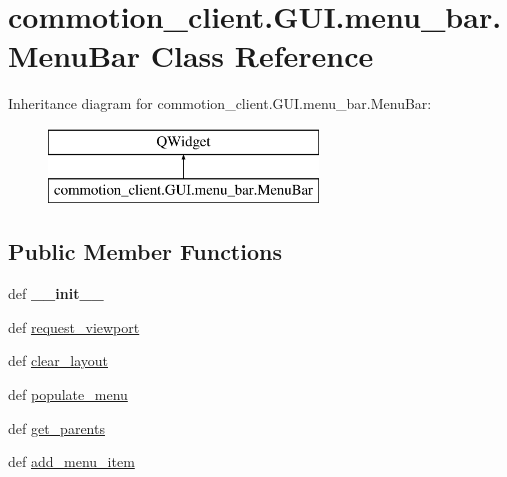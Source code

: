 \hypertarget{classcommotion__client_1_1GUI_1_1menu__bar_1_1MenuBar}{\section{commotion\+\_\+client.\+G\+U\+I.\+menu\+\_\+bar.\+Menu\+Bar Class Reference}
\label{classcommotion__client_1_1GUI_1_1menu__bar_1_1MenuBar}
}
Inheritance diagram for commotion\+\_\+client.\+G\+U\+I.\+menu\+\_\+bar.\+Menu\+Bar\+:\begin{figure}[H]
\begin{center}
\leavevmode
\includegraphics[height=2.000000cm]{classcommotion__client_1_1GUI_1_1menu__bar_1_1MenuBar}
\end{center}
\end{figure}
\subsection*{Public Member Functions}
\begin{DoxyCompactItemize}
\item 
\hypertarget{classcommotion__client_1_1GUI_1_1menu__bar_1_1MenuBar_a1f9817bd9c7f2dde1cc33aaec29151a9}{def {\bfseries \+\_\+\+\_\+init\+\_\+\+\_\+}}\label{classcommotion__client_1_1GUI_1_1menu__bar_1_1MenuBar_a1f9817bd9c7f2dde1cc33aaec29151a9}

\item 
def \hyperlink{classcommotion__client_1_1GUI_1_1menu__bar_1_1MenuBar_af0829b0f4a27a6246efbbe8c4412a283}{request\+\_\+viewport}
\item 
def \hyperlink{classcommotion__client_1_1GUI_1_1menu__bar_1_1MenuBar_aef9fda2956e1fffd9abbfbe420716519}{clear\+\_\+layout}
\item 
def \hyperlink{classcommotion__client_1_1GUI_1_1menu__bar_1_1MenuBar_a3ebeac5b69ad7004325183b547b3648a}{populate\+\_\+menu}
\item 
def \hyperlink{classcommotion__client_1_1GUI_1_1menu__bar_1_1MenuBar_a963ca3542a8f9ee6c8e8534fe530d443}{get\+\_\+parents}
\item 
def \hyperlink{classcommotion__client_1_1GUI_1_1menu__bar_1_1MenuBar_a7bbc3f3ab719dadb7943780dd17f1e82}{add\+\_\+menu\+\_\+item}
\end{DoxyCompactItemize}

